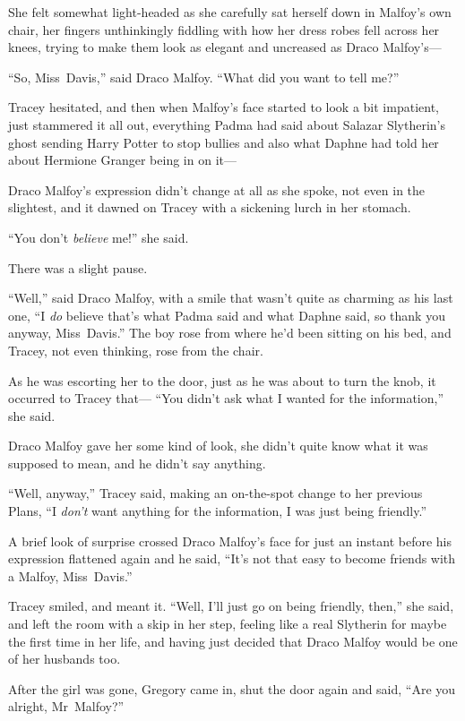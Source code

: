 She felt somewhat light-headed as she carefully sat herself down in Malfoy’s own chair, her fingers unthinkingly fiddling with how her dress robes fell across her knees, trying to make them look as elegant and uncreased as Draco Malfoy’s—

“So, Miss~Davis,” said Draco Malfoy. “What did you want to tell me?”

Tracey hesitated, and then when Malfoy’s face started to look a bit impatient, just stammered it all out, everything Padma had said about Salazar Slytherin’s ghost sending Harry Potter to stop bullies and also what Daphne had told her about Hermione Granger being in on it—

Draco Malfoy’s expression didn’t change at all as she spoke, not even in the slightest, and it dawned on Tracey with a sickening lurch in her stomach.

“You don’t \emph{believe} me!” she said.

There was a slight pause.

“Well,” said Draco Malfoy, with a smile that wasn’t quite as charming as his last one, “I \emph{do} believe that’s what Padma said and what Daphne said, so thank you anyway, Miss~Davis.” The boy rose from where he’d been sitting on his bed, and Tracey, not even thinking, rose from the chair.

As he was escorting her to the door, just as he was about to turn the knob, it occurred to Tracey that— “You didn’t ask what I wanted for the information,” she said.

Draco Malfoy gave her some kind of look, she didn’t quite know what it was supposed to mean, and he didn’t say anything.

“Well, anyway,” Tracey said, making an on-the-spot change to her previous Plans, “I \emph{don’t} want anything for the information, I was just being friendly.”

A brief look of surprise crossed Draco Malfoy’s face for just an instant before his expression flattened again and he said, “It’s not that easy to become friends with a Malfoy, Miss~Davis.”

Tracey smiled, and meant it. “Well, I’ll just go on being friendly, then,” she said, and left the room with a skip in her step, feeling like a real Slytherin for maybe the first time in her life, and having just decided that Draco Malfoy would be one of her husbands too.

\later

After the girl was gone, Gregory came in, shut the door again and said, “Are you alright, Mr~Malfoy?”

